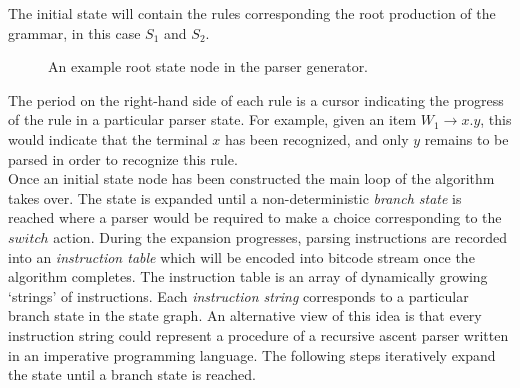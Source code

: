 \documentclass[a4paper,11pt]{article}
\begin{document}
The initial state will contain the rules corresponding the root production of the grammar, in this case $S_1$ and $S_2$.

\begin{figure}[!ht]
\begin{center}
\caption{An example root state node in the parser generator.}
\end{center}
\end{figure}

The period on the right-hand side of each rule is a cursor indicating the progress of the rule in a particular parser state.
For example, given an item $W_1 \rightarrow x . y$, this would indicate that the terminal $x$ has been recognized, and only $y$ remains to be parsed in order to recognize this rule.\\

Once an initial state node has been constructed the main loop of the algorithm takes over. 
The state is expanded until a non-deterministic \emph{branch state} is reached where a parser would be required to make a choice corresponding to the $switch$ action.
During the expansion progresses, parsing instructions are recorded into an \emph{instruction table} which will be encoded into bitcode stream once the algorithm completes.
The instruction table is an array of dynamically growing `strings' of instructions. 
Each \emph{instruction string} corresponds to a particular branch state in the state graph.
An alternative view of this idea is that every instruction string could represent a procedure of a recursive ascent parser written in an imperative programming language.
The following steps iteratively expand the state until a branch state is reached.
\end{document}
